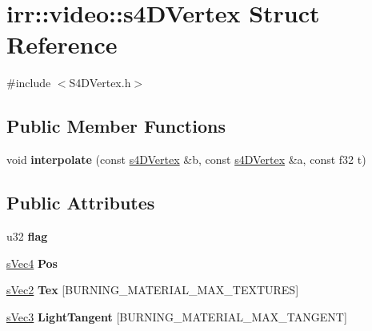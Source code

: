 \hypertarget{structirr_1_1video_1_1s4_d_vertex}{\section{irr\-:\-:video\-:\-:s4\-D\-Vertex Struct Reference}
\label{structirr_1_1video_1_1s4_d_vertex}
}


{\ttfamily \#include $<$S4\-D\-Vertex.\-h$>$}

\subsection*{Public Member Functions}
\begin{DoxyCompactItemize}
\item 
\hypertarget{structirr_1_1video_1_1s4_d_vertex_ac55677b737189adecf95ea7968a5cf30}{void {\bfseries interpolate} (const \hyperlink{structirr_1_1video_1_1s4_d_vertex}{s4\-D\-Vertex} \&b, const \hyperlink{structirr_1_1video_1_1s4_d_vertex}{s4\-D\-Vertex} \&a, const f32 t)}\label{structirr_1_1video_1_1s4_d_vertex_ac55677b737189adecf95ea7968a5cf30}

\end{DoxyCompactItemize}
\subsection*{Public Attributes}
\begin{DoxyCompactItemize}
\item 
\hypertarget{structirr_1_1video_1_1s4_d_vertex_a42b2bc8e1b0c21aed7d1a88540ec48f2}{u32 {\bfseries flag}}\label{structirr_1_1video_1_1s4_d_vertex_a42b2bc8e1b0c21aed7d1a88540ec48f2}

\item 
\hypertarget{structirr_1_1video_1_1s4_d_vertex_a0510e01a0b82401d9bc02f2473f6e287}{\hyperlink{structirr_1_1video_1_1s_vec4}{s\-Vec4} {\bfseries Pos}}\label{structirr_1_1video_1_1s4_d_vertex_a0510e01a0b82401d9bc02f2473f6e287}

\item 
\hypertarget{structirr_1_1video_1_1s4_d_vertex_a2faec8738336d7bcb5cf86ad261bd867}{\hyperlink{structirr_1_1video_1_1s_vec2}{s\-Vec2} {\bfseries Tex} \mbox{[}B\-U\-R\-N\-I\-N\-G\-\_\-\-M\-A\-T\-E\-R\-I\-A\-L\-\_\-\-M\-A\-X\-\_\-\-T\-E\-X\-T\-U\-R\-E\-S\mbox{]}}\label{structirr_1_1video_1_1s4_d_vertex_a2faec8738336d7bcb5cf86ad261bd867}

\item 
\hypertarget{structirr_1_1video_1_1s4_d_vertex_ac7143cd38893b73a52efdb9dd6196181}{\hyperlink{structirr_1_1video_1_1s_vec3}{s\-Vec3} {\bfseries Light\-Tangent} \mbox{[}B\-U\-R\-N\-I\-N\-G\-\_\-\-M\-A\-T\-E\-R\-I\-A\-L\-\_\-\-M\-A\-X\-\_\-\-T\-A\-N\-G\-E\-N\-T\mbox{]}}\label{structirr_1_1video_1_1s4_d_vertex_ac7143cd38893b73a52efdb9dd6196181}

\end{DoxyCompactItemize}


